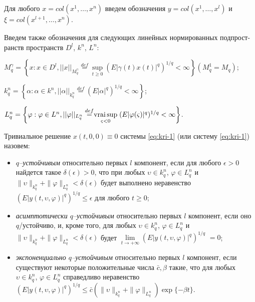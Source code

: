 Для любого $x = col (x^1, \dots, x^n)$ введем обозначения $y =  col
(x^1, \dots, x^l)$ и \\$\xi = col (x^{l+1                   }, \dots,
x^n)$.

Введем также обозначения для следующих линейных нормированных
подпрост-\linebreak ранств пространств $D^l$, $k^n$, $L^n$:

$ M_q^{\gamma } = \left \{x: x \in D^l, ||x||_{M_q^\gamma }
 \mathrel
 {\mathop {=} \limits ^{def}} \mathrel {\mathop {\sup}
 \limits _{t
 \ge 0}} (E|\gamma (t)x(t)|^q)^{1/q} < \infty \right \}  (
 M_q^1 = M_q)$;

$ k_q^n = \left \{\alpha: \alpha \in k^n, ||\alpha ||_{k_q^n}
 \mathrel
 {\mathop {=} \limits ^{def}} (E|\alpha |^q)^{1/q} < \infty
 \right  \}$;

 $L_q^n = \left \{\varphi: \varphi \in L^n,
 ||\varphi||_{L_q^n}
 \mathrel {\mathop {=} \limits ^{def}} \mathrel {\mathop
 {\operatorname*{vrai} \sup}
 \limits _{\varsigma < 0}}(E|\varphi (\varsigma ) |^q)^{1/q} < \infty
 \right \}$.


\begin{definition}\label{def:kri-2}
    Тривиальное решение $x(t,0, 0)\equiv 0$
    системы \eqref{eq:kri-1} (или систему \eqref{eq:kri-1}) назовем:

    \begin{itemize}
        \item {\it $q$--устойчивым} относительно первых $l$ компонент, если
        для любого $\epsilon > 0$ найдется такое $\delta (\epsilon) > 0$,
        что при любых $\upsilon \in k^n_q$, $\varphi \in L^n_q$ и
        $\|\upsilon\|_{k^n_q} + \|\varphi \|_{L^n_q} < \delta (\epsilon)$
        будет выполнено неравенство $(E|y(t,\upsilon, \varphi)|^q)^{1/q} \le
        \epsilon $ для любого $t \ge 0$;

        \item {\it асимптотически $q$--устойчивым }относительно первых $l$ компонент, если
        оно $q$\-/устойчиво, и, кроме того, для любых $\upsilon \in
        k^n_q$, $\varphi \in L^n_q$ и $\|\upsilon\|_{k^n_q} + \|\varphi
        \|_{L^n_q} < \delta (\epsilon)$ будет $\lim \limits_{t  \rightarrow
        +\infty }(E|y(t,\upsilon, \varphi)|^q)^{1/q}$ $ = 0$;

        \item {\it экспоненциально $q$--устойчивым }относительно первых $l$ компонент, если
        сущест\-вуют некоторые положительные числа $\bar c, \beta$ такие, что
        для любых $\upsilon \in k^n_q$, $\varphi \in L^n_q$ справедливо
        неравенство $(E|y(t,\upsilon, \varphi)|^q)^{1/q} \le \bar
        c\left(\|\upsilon\|_{k^n_q} + \|\varphi \|_{L^n_q}\right)\exp
        \{-\beta t\}$.
    \end{itemize}
\end{definition}

